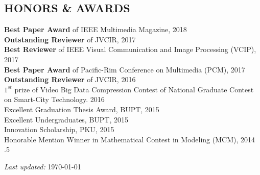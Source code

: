 \documentclass[margin, 10pt]{res} %
\begin{document}
\begin{resume}

\section{HONORS \& AWARDS}
{\bf Best Paper Award} of IEEE Multimedia Magazine, \hfill 2018 \\
{\bf Outstanding Reviewer} of JVCIR, \hfill 2017 \\
{\bf Best Reviewer} of IEEE Visual Communication and Image Processing (VCIP), \hfill 2017 \\
{\bf Best Paper Award} of Pacific-Rim Conference on Multimedia (PCM), \hfill 2017 \\
{\bf Outstanding Reviewer} of JVCIR, \hfill 2016 \\
{\bf ${1}^{st}$} prize of Video Big Data Compression Contest of National Graduate Contest on Smart-City Technology. \hfill 2016 \\
Excellent Graduation Thesis Award, BUPT, \hfill 2015 \\
Excellent Undergraduates, BUPT, \hfill 2015 \\
Innovation Scholarship, PKU, \hfill 2015 \\
Honorable Mention Winner in Mathematical Contest in Modeling (MCM), \hfill 2014 \\


\moveleft.5\hoffset\centerline{
\textit{Last updated:}
\today
}

\end{resume}
\end{document}
